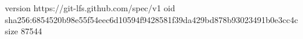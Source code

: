 version https://git-lfs.github.com/spec/v1
oid sha256:6854520b98e55f54eec6d10594f9428581f39da429bd878b93023491b0e3cc4c
size 87544
